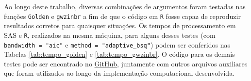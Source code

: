 \documentclass[12pt, a4paper, twoside]{report}
\numberwithin{equation}{section} %
\begin{document}

Ao longo deste trabalho, diversas combinações de argumentos foram testadas nas funções \texttt{Golden} e \texttt{gwzinbr} a fim de que o código em \texttt{R} fosse capaz de reproduzir resultados corretos para quaisquer situações. Os tempos de processamento em SAS e \texttt{R}, realizados na mesma máquina, para alguns desses testes (com \texttt{bandwidth = "aic"} e \texttt{method = "adaptive\_bsq"}) podem ser conferidos nas Tabelas \ref{tab:tempo_golden} e \ref{tab:tempo_gwzinbr}. O código para os demais testes pode ser encontrado no \href{https://github.com/julianamrosa/GWZINBR_TCC}{GitHub}, juntamente com outros arquivos auxiliares que foram utilizados ao longo da implementação computacional desenvolvida.

\end{document}
